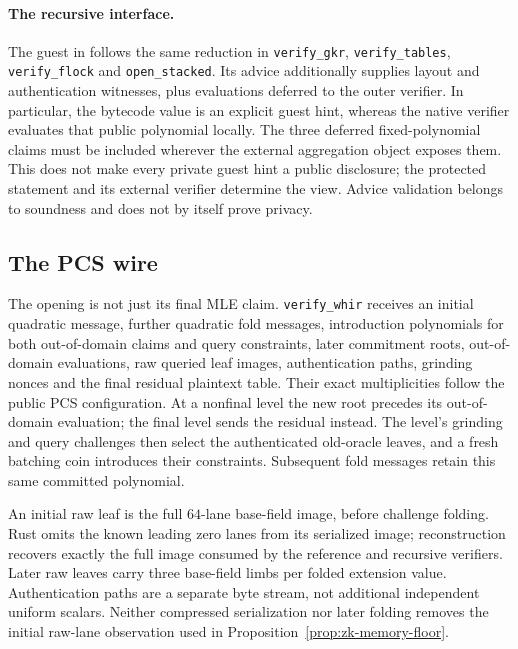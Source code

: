 \paragraph{The recursive interface.} The guest in  follows the same reduction in \texttt{verify\_gkr}, \texttt{verify\_tables}, \texttt{verify\_flock} and \texttt{open\_stacked}. Its advice additionally supplies layout and authentication witnesses, plus evaluations deferred to the outer verifier. In particular, the bytecode value is an explicit guest hint, whereas the native verifier evaluates that public polynomial locally. The three deferred fixed-polynomial claims must be included wherever the external aggregation object exposes them. This does not make every private guest hint a public disclosure; the protected statement and its external verifier determine the view. Advice validation belongs to soundness and does not by itself prove privacy.

\subsection{The PCS wire}

The opening is not just its final MLE claim. \texttt{verify\_whir} receives an initial quadratic message, further quadratic fold messages, introduction polynomials for both out-of-domain claims and query constraints, later commitment roots, out-of-domain evaluations, raw queried leaf images, authentication paths, grinding nonces and the final residual plaintext table. Their exact multiplicities follow the public PCS configuration. At a nonfinal level the new root precedes its out-of-domain evaluation; the final level sends the residual instead. The level's grinding and query challenges then select the authenticated old-oracle leaves, and a fresh batching coin introduces their constraints. Subsequent fold messages retain this same committed polynomial.

An initial raw leaf is the full $64$-lane base-field image, before challenge folding. Rust omits the known leading zero lanes from its serialized image; reconstruction recovers exactly the full image consumed by the reference and recursive verifiers. Later raw leaves carry three base-field limbs per folded extension value. Authentication paths are a separate byte stream, not additional independent uniform scalars. Neither compressed serialization nor later folding removes the initial raw-lane observation used in Proposition~\ref{prop:zk-memory-floor}.


